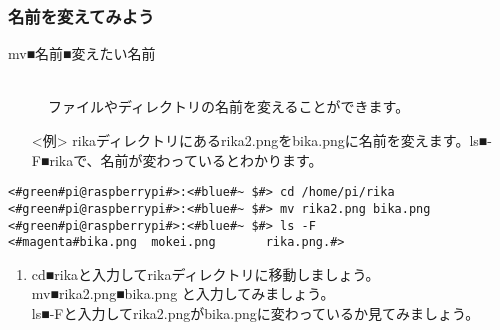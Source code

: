 \subsubsection{名前を変えてみよう}
\begin{description}
\item[mv■名前■変えたい名前]\mbox{}\\
ファイルやディレクトリの名前を変えることができます。
\end{description}
\begin{itemize}
\item[<例>]rikaディレクトリにあるrika2.pngをbika.pngに名前を変えます。ls■-F■rikaで、名前が変わっているとわかります。
\end{itemize}
\begin{lstlisting}[caption=mvNameの例, label=mvName]
<#green#pi@raspberrypi#>:<#blue#~ $#> cd /home/pi/rika
<#green#pi@raspberrypi#>:<#blue#~ $#> mv rika2.png bika.png
<#green#pi@raspberrypi#>:<#blue#~ $#> ls -F
<#magenta#bika.png	mokei.png		rika.png.#>
\end{lstlisting}
\begin{tcolorbox}[title=\useOmetoi]
\begin{enumerate}
\item cd■rikaと入力してrikaディレクトリに移動しましょう。\\ mv■rika2.png■bika.png と入力してみましょう。\\ls■-Fと入力してrika2.pngがbika.pngに変わっているか見てみましょう。\\
\end{enumerate}
\end{tcolorbox}

